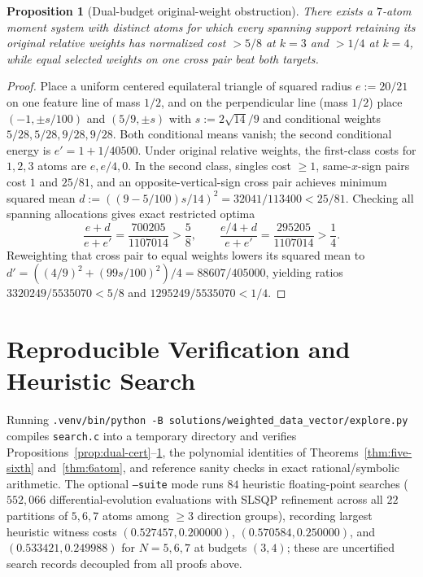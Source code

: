 \documentclass[11pt]{article}
\theoremstyle{plain}
\newtheorem{proposition}[theorem]{Proposition}
\theoremstyle{definition}
\theoremstyle{remark}
\begin{document}
\begin{proposition}[Dual-budget original-weight obstruction]\label{prop:orig-weight}
There exists a $7$-atom moment system with distinct atoms for which every spanning support retaining its original relative weights has normalized cost $> 5/8$ at $k=3$ and $> 1/4$ at $k=4$, while equal selected weights on one cross pair beat both targets.
\end{proposition}

\begin{proof}
Place a uniform centered equilateral triangle of squared radius $e := 20/21$ on one feature line of mass $1/2$, and on the perpendicular line (mass $1/2$) place $(-1, \pm s/100)$ and $(5/9, \pm s)$ with $s := 2\sqrt{14}/9$ and conditional weights $5/28, 5/28, 9/28, 9/28$.
Both conditional means vanish; the second conditional energy is $e' = 1 + 1/40500$.
Under original relative weights, the first-class costs for $1,2,3$ atoms are $e, e/4, 0$.
In the second class, singles cost $\ge 1$, same-$x$-sign pairs cost $1$ and $25/81$, and an opposite-vertical-sign cross pair achieves minimum squared mean $d := ((9 - 5/100)s/14)^2 = 32041/113400 < 25/81$.
Checking all spanning allocations gives exact restricted optima
\[
\frac{e + d}{e + e'} = \frac{700205}{1107014} > \frac{5}{8}, \qquad
\frac{e/4 + d}{e + e'} = \frac{295205}{1107014} > \frac{1}{4}.
\]
Reweighting that cross pair to equal weights lowers its squared mean to $d' = ((4/9)^2 + (99s/100)^2)/4 = 88607/405000$, yielding ratios $3320249/5535070 < 5/8$ and $1295249/5535070 < 1/4$.
\end{proof}

\section{Reproducible Verification and Heuristic Search}

Running \texttt{.venv/bin/python -B solutions/weighted\_data\_vector/explore.py} compiles \texttt{search.c} into a temporary directory and verifies Propositions~\ref{prop:dual-cert}--\ref{prop:orig-weight}, the polynomial identities of Theorems~\ref{thm:five-sixth} and~\ref{thm:6atom}, and reference sanity checks in exact rational/symbolic arithmetic.
The optional \texttt{--suite} mode runs $84$ heuristic floating-point searches ($552{,}066$ differential-evolution evaluations with SLSQP refinement across all $22$ partitions of $5,6,7$ atoms among $\ge 3$ direction groups), recording largest heuristic witness costs $(0.527457, 0.200000)$, $(0.570584, 0.250000)$, and $(0.533421, 0.249988)$ for $N = 5, 6, 7$ at budgets $(3, 4)$; these are uncertified search records decoupled from all proofs above.
\end{document}
